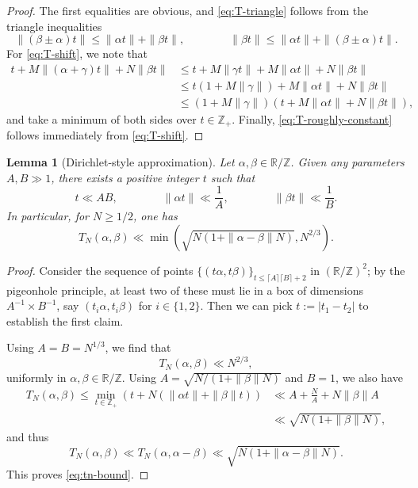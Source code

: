 \documentclass[reqno,11pt]{amsart}
\newtheorem{lemma}[theorem]{Lemma}
\theoremstyle{remark}
\numberwithin{equation}{section}
\newcommand{\Z}{\mathbb{Z}}
\newcommand{\R}{\mathbb{R}}
\begin{document}
\begin{proof}
The first equalities are obvious, and \cref{eq:T-triangle} follows from the triangle inequalities 
\[
    \|(\beta \pm \alpha)t\| \le \|\alpha t\| + \|\beta t\|, \qquad \qquad \|\beta t\| \le \|\alpha t\| + \|(\beta \pm \alpha)t\|.
\]
For \cref{eq:T-shift}, we note that 
\[
\begin{aligned}
    t + M\|(\alpha + \gamma) t\| + N\|\beta t\| 
    &\le 
    t + M\|\gamma t\| + M\|\alpha t\| + N\|\beta t\| 
    \\
    &\le 
    t(1 + M\|\gamma\|) +  M\|\alpha t\| + N\|\beta t\| 
    \\
    &\le 
    (1 + M\|\gamma\|) \left(t + M\|\alpha t\| + N\|\beta t\|\right),
\end{aligned}
\]
and take a minimum of both sides over $t \in \Z_+$. Finally, \cref{eq:T-roughly-constant} follows immediately from \cref{eq:T-shift}.
\end{proof}

\begin{lemma}[Dirichlet-style approximation] \label{lem:pigeonhole}
Let $\alpha, \beta \in \R/\Z$. Given any parameters $A, B \gg 1$, there exists a positive integer $t$ such that
\[
    t \ll AB, \qquad\qquad 
    \|\alpha t\| \ll \frac{1}{A}, \qquad\qquad 
    \|\beta t\| \ll \frac{1}{B}.
\]
In particular, for $N \ge 1/2$, one has
\begin{equation} \label{eq:tn-bound}
    T_N(\alpha, \beta) \ll \min \left(\sqrt{N(1 + \|\alpha-\beta\| N)}, N^{2/3} \right).
\end{equation}
\end{lemma}

\begin{proof}
Consider the sequence of points $\{(t\alpha, t\beta)\}_{t \le \lceil A \rceil \lceil B \rceil + 2}$ in $(\R/\Z)^2$; by the pigeonhole principle, at least two of these must lie in a box of dimensions $A^{-1} \times B^{-1}$, say $(t_i \alpha, t_i \beta)$ for $i \in \{1, 2\}$. Then we can pick $t := |t_1 - t_2|$ to establish the first claim.

Using $A = B = N^{1/3}$, we find that
\[
    T_N(\alpha, \beta) \ll N^{2/3},
\]
uniformly in $\alpha, \beta \in \R/\Z$. Using $A = \sqrt{N/(1+ \|\beta\| N)}$ and $B = 1$, we also have
\[
\begin{aligned}
    T_N(\alpha, \beta) 
    \le 
    \min_{t \in \Z_+} 
    \left(t + N\left(\|\alpha t\| + \|\beta\| t\right) \right)
    &\ll 
    A + \frac{N}{A} + N \|\beta\| A
    \\
    &\ll 
    \sqrt{N(1 + \|\beta\|N)},
\end{aligned}
\]
and thus
\[
    T_N(\alpha, \beta) \ll T_N(\alpha, \alpha - \beta) \ll 
    \sqrt{N(1 + \|\alpha - \beta\|N)}.
\]
This proves \cref{eq:tn-bound}.
\end{proof}
\end{document}
